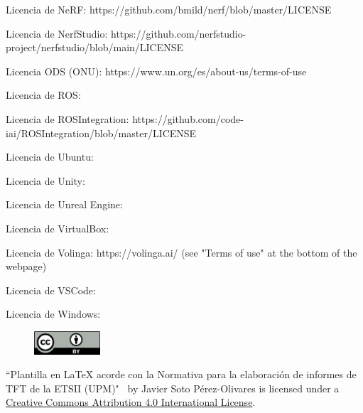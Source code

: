 \documentclass[a4paper, 12pt, spanish, twoside]{article}
\begin{document}
Licencia de NeRF: https://github.com/bmild/nerf/blob/master/LICENSE

Licencia de NerfStudio: https://github.com/nerfstudio-project/nerfstudio/blob/main/LICENSE

Licencia ODS (ONU): https://www.un.org/es/about-us/terms-of-use

Licencia de ROS: 

Licencia de ROSIntegration: https://github.com/code-iai/ROSIntegration/blob/master/LICENSE

Licencia de Ubuntu: 

Licencia de Unity: 

Licencia de Unreal Engine: 

Licencia de VirtualBox: 

Licencia de Volinga: https://volinga.ai/ (see "Terms of use" at the bottom of the webpage)

Licencia de VSCode: 

Licencia de Windows: 

\begin{figure}
    \vspace{-\baselineskip}
    \href{http://creativecommons.org/licenses/by/4.0/}{\includegraphics[width=0.22\textwidth]{licencias/cc-by.png}}
\end{figure} 

``Plantilla en LaTeX acorde con la Normativa para la elaboración de informes de TFT de la ETSII (UPM)" \ by Javier Soto Pérez-Olivares is licensed under a \href{http://creativecommons.org/licenses/by/4.0/}{Creative Commons Attribution 4.0 International License}.

\clearpage



\end{document}
